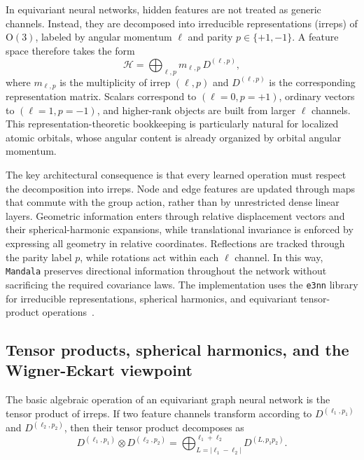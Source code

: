 \documentclass[preprint,12pt,compress,numafflabel]{elsarticle}
\begin{document}
In equivariant neural networks, hidden features are not treated as generic channels. Instead, they are decomposed into irreducible representations (irreps) of $\mathrm{O}(3)$, labeled by angular momentum $\ell$ and parity $p \in \{+1,-1\}$. A feature space therefore takes the form
\begin{equation}
\mathcal{H}
=
\bigoplus_{\ell,p} m_{\ell,p} \, D^{(\ell,p)},
\end{equation}
where $m_{\ell,p}$ is the multiplicity of irrep $(\ell,p)$ and
$D^{(\ell,p)}$ is the corresponding representation matrix.
Scalars correspond to $(\ell=0,p=+1)$, ordinary vectors to $(\ell=1,p=-1)$, and higher-rank objects are built from larger $\ell$ channels.
This representation-theoretic bookkeeping is particularly natural for localized atomic orbitals, whose angular content is already organized by orbital angular momentum.

The key architectural consequence is that every learned operation must respect the decomposition into irreps.
Node and edge features are updated through maps that commute with the group action, rather than by unrestricted dense linear
layers.
Geometric information enters through relative displacement vectors and their spherical-harmonic expansions, while translational invariance is enforced by expressing all geometry in relative coordinates.
Reflections are tracked through the parity label $p$, while rotations act within each $\ell$ channel.
In this way, \texttt{Mandala} preserves directional information throughout the network without sacrificing the required covariance laws. The implementation uses the \texttt{e3nn} library for irreducible representations, spherical harmonics, and equivariant tensor-product operations~\cite{GeigerSmidt2022}.


\subsection{Tensor products, spherical harmonics, and the Wigner-Eckart viewpoint}
\label{subsec:tensor_products_background}

The basic algebraic operation of an equivariant graph neural network is the tensor product of irreps.
If two feature channels transform according to
$D^{(\ell_1,p_1)}$ and $D^{(\ell_2,p_2)}$, then their tensor product decomposes as
\begin{equation}
D^{(\ell_1,p_1)} \otimes D^{(\ell_2,p_2)}
=
\bigoplus_{L=|\ell_1-\ell_2|}^{\ell_1+\ell_2}
D^{(L,p_1 p_2)}.
\end{equation}
\end{document}
